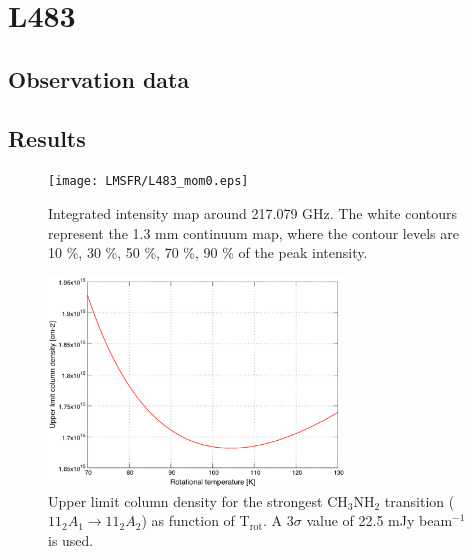 
\section{L483}
\subsection{Observation data}
\subsection{Results}

\begin{figure}[H]
  \centering
  \texttt{[image: LMSFR/L483\_mom0.eps]}
  \caption{Integrated intensity map around 217.079 GHz. The white contours represent the 1.3 mm continuum map, where the contour levels are 10 \%, 30 \%, 50 \%, 70 \%, 90 \% of the peak intensity.}
  \label{L483_mom0}
\end{figure}

\begin{figure}[H]
  \centering
  \includegraphics[width=0.7\textwidth]{LMSFR/L483.eps}
  \caption{Upper limit column density for the strongest CH$_{3}$NH$_{2}$ transition
  ($11_{2}A_{1} \rightarrow 11_{2}A_{2}$) as function of T$_{\textrm{rot}}$. A 3$\sigma$ value of 
  22.5 mJy beam$^{-1}$ is used.}
  \label{L483_MA}
\end{figure}


